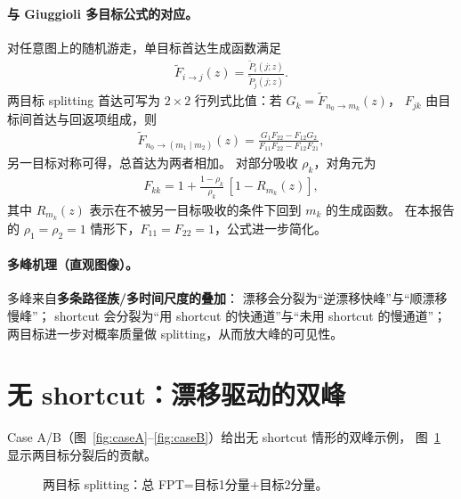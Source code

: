 \documentclass[11pt]{ctexart}
\begin{document}
\paragraph{与 Giuggioli 多目标公式的对应。}
对任意图上的随机游走，单目标首达生成函数满足
\begin{align}
  \widetilde F_{i\to j}(z)=\frac{\widetilde P_i(j;z)}{\widetilde P_j(j;z)}.
\end{align}
两目标 splitting 首达可写为 $2\times2$ 行列式比值\cite{giuggioli2023}：若
$G_k=\widetilde F_{n_0\to m_k}(z)$，
$F_{jk}$ 由目标间首达与回返项组成，则
\begin{align}
\widetilde F_{n_0\to (m_1\mid m_2)}(z)=\frac{G_1F_{22}-F_{12}G_2}{F_{11}F_{22}-F_{12}F_{21}},
\end{align}
另一目标对称可得，总首达为两者相加。
对部分吸收 $\rho_k$，对角元为
\begin{align}
  F_{kk}=1+\frac{1-\rho_k}{\rho_k}\,[1-R_{m_k}(z)],
\end{align}
其中 $R_{m_k}(z)$ 表示在不被另一目标吸收的条件下回到 $m_k$ 的生成函数。
在本报告的 $\rho_1=\rho_2=1$ 情形下，$F_{11}=F_{22}=1$，公式进一步简化。

\paragraph{多峰机理（直观图像）。}
多峰来自\textbf{多条路径族/多时间尺度的叠加}：
漂移会分裂为“逆漂移快峰”与“顺漂移慢峰”；
shortcut 会分裂为“用 shortcut 的快通道”与“未用 shortcut 的慢通道”；
两目标进一步对概率质量做 splitting，从而放大峰的可见性。

\section*{无 shortcut：漂移驱动的双峰}
Case A/B（图~\ref{fig:caseA}--\ref{fig:caseB}）给出无 shortcut 情形的双峰示例，
图~\ref{fig:splitting} 显示两目标分裂后的贡献。

\begin{figure}[!htbp]
  \centering
  \caption{两目标 splitting：总 FPT=目标1分量+目标2分量。}
  \label{fig:splitting}
\end{figure}
\end{document}
